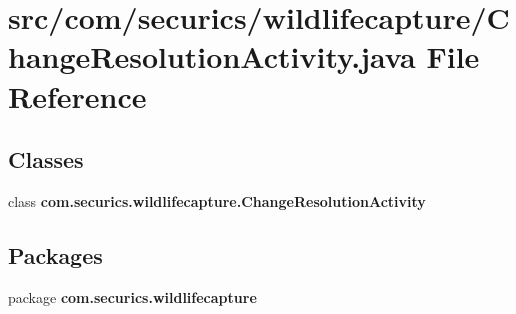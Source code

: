 \section{src/com/securics/wildlifecapture/\+Change\+Resolution\+Activity.java File Reference}
\label{_change_resolution_activity_8java}
\subsection*{Classes}
\begin{DoxyCompactItemize}
\item 
class {\bf com.\+securics.\+wildlifecapture.\+Change\+Resolution\+Activity}
\end{DoxyCompactItemize}
\subsection*{Packages}
\begin{DoxyCompactItemize}
\item 
package {\bf com.\+securics.\+wildlifecapture}
\end{DoxyCompactItemize}
